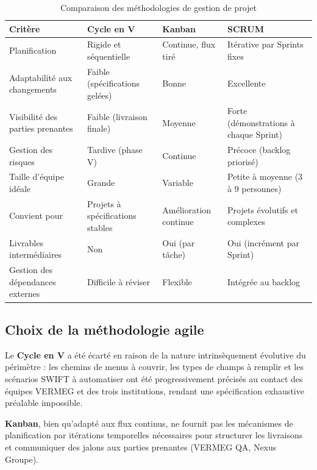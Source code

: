 \documentclass[12pt, a4paper]{report}
\begin{document}
\begin{table}[H]
\centering
\caption{Comparaison des méthodologies de gestion de projet}
\label{tab:comparaison_methodologies}
\renewcommand{\arraystretch}{1.2}
\begin{tabularx}{\textwidth}{|p{3.5cm}|X|X|X|}
\hline
\textbf{Critère} &
\textbf{Cycle en V} &
\textbf{Kanban} &
\textbf{SCRUM} \\
\hline
Planification &
Rigide et séquentielle &
Continue, flux tiré &
Itérative par Sprints fixes \\
\hline
Adaptabilité aux changements &
Faible (spécifications gelées) &
Bonne &
Excellente \\
\hline
Visibilité des parties prenantes &
Faible (livraison finale) &
Moyenne &
Forte (démonstrations à chaque Sprint) \\
\hline
Gestion des risques &
Tardive (phase V) &
Continue &
Précoce (backlog priorisé) \\
\hline
Taille d'équipe idéale &
Grande &
Variable &
Petite à moyenne (3 à 9 personnes) \\
\hline
Convient pour &
Projets à spécifications stables &
Amélioration continue &
Projets évolutifs et complexes \\
\hline
Livrables intermédiaires &
Non &
Oui (par tâche) &
Oui (incrément par Sprint) \\
\hline
Gestion des dépendances externes &
Difficile à réviser &
Flexible &
Intégrée au backlog \\
\hline
\end{tabularx}
\end{table}

\subsection{Choix de la méthodologie agile}

Le \textbf{Cycle en V} a été écarté en raison de la nature intrinsèquement évolutive du périmètre : les chemins de menus à couvrir, les types de champs à remplir et les scénarios SWIFT à automatiser ont été progressivement précisés au contact des équipes VERMEG et des trois institutions, rendant une spécification exhaustive préalable impossible.

\textbf{Kanban}, bien qu'adapté aux flux continus, ne fournit pas les mécanismes de planification par itérations temporelles nécessaires pour structurer les livraisons et communiquer des jalons aux parties prenantes (VERMEG QA, Nexus Groupe).
\end{document}
